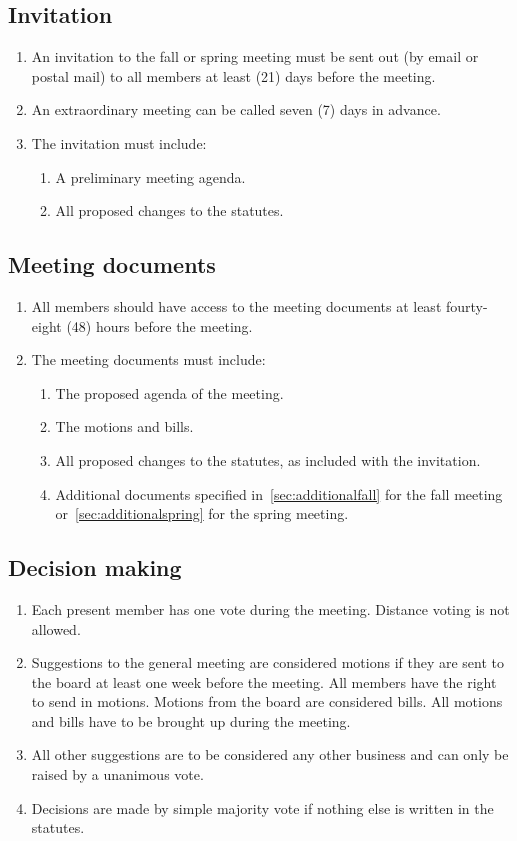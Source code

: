 \subsection{Invitation} \label{sec:meetingInvitation}
\begin{enumerate}
  \item An invitation to the fall or spring meeting must be sent out (by email or postal mail) to all members at least (21) days before the meeting.
  \item An extraordinary meeting can be called seven (7) days in advance. 
  \item The invitation must include:
  \begin{enumerate}
    \item A preliminary meeting agenda.
    \item All proposed changes to the statutes.
  \end{enumerate}
\end{enumerate}

\subsection{Meeting documents} \label{sec:regMeetingDocs}
\begin{enumerate}
  \item All members should have access to the meeting documents at least fourty-eight (48) hours before the meeting. 
  \item The meeting documents must include:
  \begin{enumerate}
    \item The proposed agenda of the meeting.
    \item The motions and bills.
    \item All proposed changes to the statutes, as included with the invitation.
    \item Additional documents specified in~\ref{sec:additionalfall} for the fall meeting or~\ref{sec:additionalspring} for the spring meeting.
  \end{enumerate}
\end{enumerate}

\subsection{Decision making}
\begin{enumerate}
  \item Each present member has one vote during the meeting. Distance voting is not allowed.
  \item Suggestions to the general meeting are considered motions if they are sent to the board at least one week before the meeting. All members have the right to send in motions. Motions from the board are considered bills. All motions and bills have to be brought up during the meeting. 
  \item All other suggestions are to be considered any other business and can only be raised by a unanimous vote.
  \item Decisions are made by simple majority vote if nothing else is written in the statutes. 
\end{enumerate}
